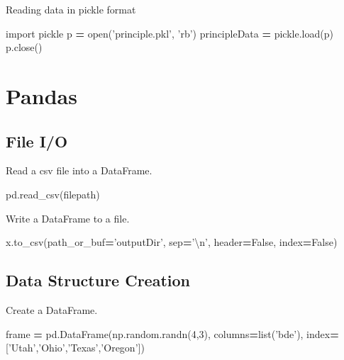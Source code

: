 \documentclass[]{book}
\newenvironment{Shaded}{\begin{snugshade}}{\end{snugshade}}
\newcommand{\BuiltInTok}[1]{#1}
\newcommand{\CharTok}[1]{\textcolor[rgb]{0.31,0.60,0.02}{#1}}
\newcommand{\DecValTok}[1]{\textcolor[rgb]{0.00,0.00,0.81}{#1}}
\newcommand{\ImportTok}[1]{#1}
\newcommand{\NormalTok}[1]{#1}
\newcommand{\OperatorTok}[1]{\textcolor[rgb]{0.81,0.36,0.00}{\textbf{#1}}}
\newcommand{\StringTok}[1]{\textcolor[rgb]{0.31,0.60,0.02}{#1}}
\newcommand{\VariableTok}[1]{\textcolor[rgb]{0.00,0.00,0.00}{#1}}
\begin{document}
Reading data in pickle format

\begin{Shaded}
\begin{Highlighting}[]
\ImportTok{import}\NormalTok{ pickle}
\NormalTok{p }\OperatorTok{=} \BuiltInTok{open}\NormalTok{(}\StringTok{'principle.pkl'}\NormalTok{, }\StringTok{'rb'}\NormalTok{)}
\NormalTok{principleData }\OperatorTok{=}\NormalTok{ pickle.load(p)}
\NormalTok{p.close()}
\end{Highlighting}
\end{Shaded}

\hypertarget{pandas}{%
\chapter{Pandas}\label{pandas}}

\hypertarget{file-io}{%
\section{File I/O}\label{file-io}}

Read a csv file into a DataFrame.

\begin{Shaded}
\begin{Highlighting}[]
\NormalTok{pd.read_csv(filepath)}
\end{Highlighting}
\end{Shaded}

Write a DataFrame to a file.

\begin{Shaded}
\begin{Highlighting}[]
\NormalTok{x.to_csv(path_or_buf}\OperatorTok{=}\StringTok{'outputDir'}\NormalTok{, sep}\OperatorTok{=}\StringTok{'}\CharTok{\textbackslash{}n}\StringTok{'}\NormalTok{, header}\OperatorTok{=}\VariableTok{False}\NormalTok{, index}\OperatorTok{=}\VariableTok{False}\NormalTok{)}
\end{Highlighting}
\end{Shaded}

\hypertarget{data-structure-creation}{%
\section{Data Structure Creation}\label{data-structure-creation}}

Create a DataFrame.

\begin{Shaded}
\begin{Highlighting}[]
\NormalTok{frame }\OperatorTok{=}\NormalTok{ pd.DataFrame(np.random.randn(}\DecValTok{4}\NormalTok{,}\DecValTok{3}\NormalTok{), columns}\OperatorTok{=}\BuiltInTok{list}\NormalTok{(}\StringTok{'bde'}\NormalTok{), index}\OperatorTok{=}\NormalTok{[}\StringTok{'Utah'}\NormalTok{,}\StringTok{'Ohio'}\NormalTok{,}\StringTok{'Texas'}\NormalTok{,}\StringTok{'Oregon'}\NormalTok{])}
\end{Highlighting}
\end{Shaded}
\end{document}

